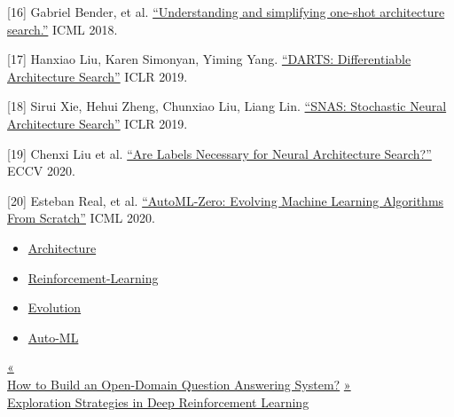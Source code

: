 {[}16{]} Gabriel Bender, et al. \href{http://proceedings.mlr.press/v80/bender18a.html}{``Understanding and simplifying one-shot architecture search.''} ICML 2018.

{[}17{]} Hanxiao Liu, Karen Simonyan, Yiming Yang. \href{https://arxiv.org/abs/1806.09055}{``DARTS: Differentiable Architecture Search''} ICLR 2019.

{[}18{]} Sirui Xie, Hehui Zheng, Chunxiao Liu, Liang Lin. \href{https://arxiv.org/abs/1812.09926}{``SNAS: Stochastic Neural Architecture Search''} ICLR 2019.

{[}19{]} Chenxi Liu et al. \href{https://arxiv.org/abs/2003.12056}{``Are Labels Necessary for Neural Architecture Search?''} ECCV 2020.

{[}20{]} Esteban Real, et al. \href{https://arxiv.org/abs/2003.03384}{``AutoML-Zero: Evolving Machine Learning Algorithms From Scratch''} ICML 2020.

\begin{itemize}
\tightlist
\item
  \href{https://lilianweng.github.io/tags/architecture/}{Architecture}
\item
  \href{https://lilianweng.github.io/tags/reinforcement-learning/}{Reinforcement-Learning}
\item
  \href{https://lilianweng.github.io/tags/evolution/}{Evolution}
\item
  \href{https://lilianweng.github.io/tags/auto-ml/}{Auto-ML}
\end{itemize}

\href{https://lilianweng.github.io/posts/2020-10-29-odqa/}{{« }\\
{How to Build an Open-Domain Question Answering System?}} \href{https://lilianweng.github.io/posts/2020-06-07-exploration-drl/}{{ »}\\
{Exploration Strategies in Deep Reinforcement Learning}}

